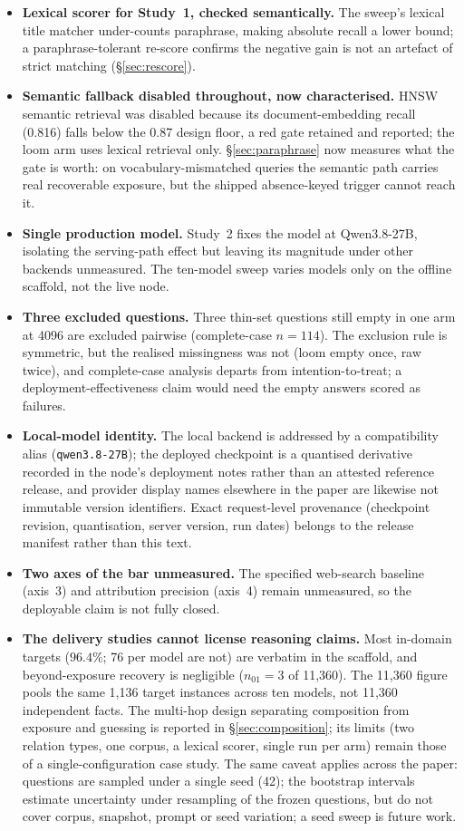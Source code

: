 \documentclass[10pt,twocolumn]{article}
\begin{document}
\begin{itemize}[topsep=2pt,itemsep=2pt,leftmargin=1.4em]
\item \textbf{Lexical scorer for Study~1, checked semantically.} The sweep's lexical title matcher under-counts paraphrase, making absolute recall a lower bound; a paraphrase-tolerant re-score confirms the negative gain is not an artefact of strict matching (\S\ref{sec:rescore}).
\item \textbf{Semantic fallback disabled throughout, now characterised.} HNSW semantic retrieval was disabled because its document-embedding recall (0.816) falls below the 0.87 design floor, a red gate retained and reported; the loom arm uses lexical retrieval only. \S\ref{sec:paraphrase} now measures what the gate is worth: on vocabulary-mismatched queries the semantic path carries real recoverable exposure, but the shipped absence-keyed trigger cannot reach it.
\item \textbf{Single production model.} Study~2 fixes the model at Qwen3.8-27B, isolating the serving-path effect but leaving its magnitude under other backends unmeasured. The ten-model sweep varies models only on the offline scaffold, not the live node.
\item \textbf{Three excluded questions.} Three thin-set questions still empty in one arm at 4096 are excluded pairwise (complete-case $n=114$). The exclusion rule is symmetric, but the realised missingness was not (loom empty once, raw twice), and complete-case analysis departs from intention-to-treat; a deployment-effectiveness claim would need the empty answers scored as failures.
\item \textbf{Local-model identity.} The local backend is addressed by a compatibility alias (\texttt{qwen3.8-27B}); the deployed checkpoint is a quantised derivative recorded in the node's deployment notes rather than an attested reference release, and provider display names elsewhere in the paper are likewise not immutable version identifiers. Exact request-level provenance (checkpoint revision, quantisation, server version, run dates) belongs to the release manifest rather than this text.
\item \textbf{Two axes of the bar unmeasured.} The specified web-search baseline (axis~3) and attribution precision (axis~4) remain unmeasured, so the deployable claim is not fully closed.
\item \textbf{The delivery studies cannot license reasoning claims.} Most in-domain targets ($96.4\%$; 76 per model are not) are verbatim in the scaffold, and beyond-exposure recovery is negligible ($n_{01}=3$ of 11{,}360). The 11{,}360 figure pools the same 1{,}136 target instances across ten models, not 11{,}360 independent facts. The multi-hop design separating composition from exposure and guessing is reported in \S\ref{sec:composition}; its limits (two relation types, one corpus, a lexical scorer, single run per arm) remain those of a single-configuration case study. The same caveat applies across the paper: questions are sampled under a single seed (42); the bootstrap intervals estimate uncertainty under resampling of the frozen questions, but do not cover corpus, snapshot, prompt or seed variation; a seed sweep is future work.
\end{itemize}
\end{document}
